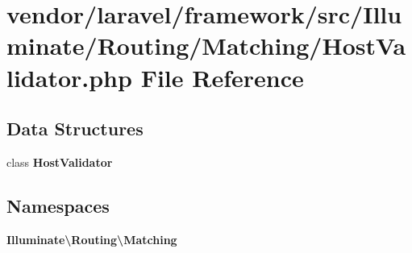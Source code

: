 \section{vendor/laravel/framework/src/\+Illuminate/\+Routing/\+Matching/\+Host\+Validator.php File Reference}
\label{_host_validator_8php}
\subsection*{Data Structures}
\begin{DoxyCompactItemize}
\item 
class {\bf Host\+Validator}
\end{DoxyCompactItemize}
\subsection*{Namespaces}
\begin{DoxyCompactItemize}
\item 
 {\bf Illuminate\textbackslash{}\+Routing\textbackslash{}\+Matching}
\end{DoxyCompactItemize}
